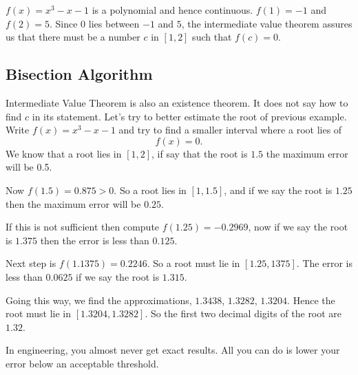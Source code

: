 \documentclass[../calc1-main.tex]{subfiles}
\begin{document}
\begin{solution}
	$f(x) = x^3 - x - 1$ is a polynomial and hence continuous. $f(1) = -1$ and $f(2) = 5$. Since $0$ lies between $-1$ and $5$, the intermediate value theorem assures us that there must be a number $c$ in $[1, 2]$ such that $f(c) = 0$.
\end{solution}

\subsection*{Bisection Algorithm}
Intermediate Value Theorem is also an existence theorem. It does not say how to find $c$ in its statement. Let's try to better estimate the root of previous example. Write $f(x) = x^3 - x - 1$ and try to find a smaller interval where a root lies of
\[
	f(x) = 0.
\]
We know that a root lies in $[1, 2]$, if say that the root is $1.5$ the maximum error will be 0.5.

Now $f(1.5)=0.875 > 0$. So a root lies in $[1, 1.5]$, and if we say the root is $1.25$ then the maximum error will be $0.25$.

If this is not sufficient then compute $f(1.25)=-0.2969$, now if we say the root is $1.375$ then the error is less than $0.125$.

Next step is $f(1.1375) = 0.2246$. So a root must lie in $[1.25, 1375]$. The error is less than $0.0625$ if we say the root is $1.315$.

Going this way, we find the approximations, $1.3438$, $1.3282$, $1.3204$. Hence the root must lie in $[1.3204, 1.3282]$. So the first two decimal digits of the root are $1.32$.

In engineering, you almost never get exact results. All you can do is lower your error below an acceptable threshold.
\end{document}
